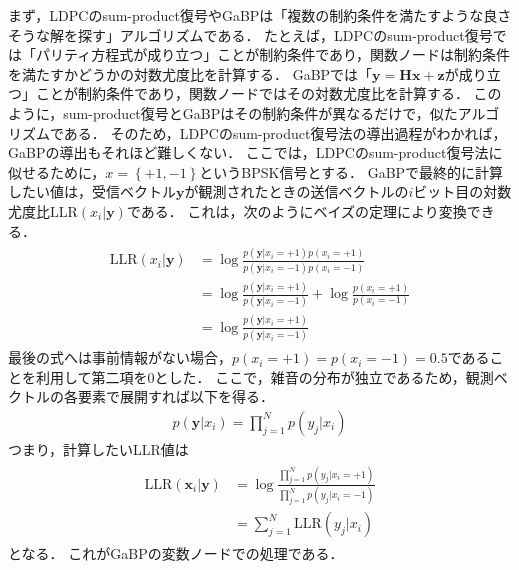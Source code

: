 \documentclass[twocolumn, a4paper]{ieicejsp}
\newcommand{\Brkts}[1]{\left\{#1\right\}}
\begin{document}
まず，LDPCのsum-product復号やGaBPは「複数の制約条件を満たすような良さそうな解を探す」アルゴリズムである．
たとえば，LDPCのsum-product復号では「パリティ方程式が成り立つ」ことが制約条件であり，関数ノードは制約条件を満たすかどうかの対数尤度比を計算する．
GaBPでは「$\mathbf{y} = \mathbf{H} \mathbf{x} + \mathbf{z}$が成り立つ」ことが制約条件であり，関数ノードではその対数尤度比を計算する．
このように，sum-product復号とGaBPはその制約条件が異なるだけで，似たアルゴリズムである．
そのため，LDPCのsum-product復号法の導出過程がわかれば，GaBPの導出もそれほど難しくない．
ここでは，LDPCのsum-product復号法に似せるために，$x=\Brkts{+1, -1}$というBPSK信号とする．
GaBPで最終的に計算したい値は，受信ベクトル$\mathbf{y}$が観測されたときの送信ベクトルの$i$ビット目の対数尤度比$\mathrm{LLR}(x_i | \mathbf{y})$である．
これは，次のようにベイズの定理により変換できる．
\begin{align}
  \begin{split}
    \mathrm{LLR}(x_i | \mathbf{y}) &=  \log \frac{p(\mathbf{y}|x_i=+1)p(x_i=+1)}{p(\mathbf{y}|x_i=-1)p(x_i=-1)}\\
    &= \log \frac{p(\mathbf{y}|x_i=+1)}{p(\mathbf{y}|x_i=-1)} + \log \frac{p(x_i=+1)}{p(x_i=-1)} \\
    &= \log \frac{p(\mathbf{y}|x_i=+1)}{p(\mathbf{y}|x_i=-1)}
  \end{split}
\end{align}
最後の式へは事前情報がない場合，$p(x_i=+1)=p(x_i=-1)=0.5$であることを利用して第二項を0とした．
ここで，雑音の分布が独立であるため，観測ベクトルの各要素で展開すれば以下を得る．
\begin{align}
  p(\mathbf{y} | x_i) = \prod_{j=1}^{N} p(y_j | x_i)
\end{align}
つまり，計算したいLLR値は
\begin{align}
  \begin{split}
    \mathrm{LLR}(\mathbf{x}_i | \mathbf{y}) &= \log \frac{\displaystyle \prod_{j=1}^{N} p(y_j | x_i=+1) }{\displaystyle \prod_{j=1}^{N} p(y_j | x_i=-1) } \\
    &= \sum_{j=1}^N \mathrm{LLR}(y_j | x_i)
  \end{split}
\end{align}
となる．
これがGaBPの変数ノードでの処理である．
\end{document}
